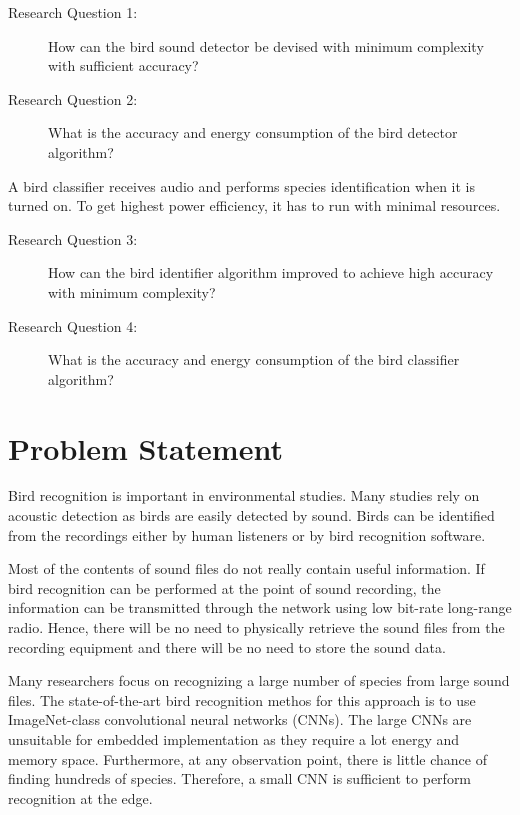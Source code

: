 \begin{description}
    \item [Research Question 1:] How can the bird sound detector be devised with minimum complexity with sufficient accuracy?
    \item [Research Question 2:] What is the accuracy and energy consumption of the bird detector algorithm?
\end{description}

A bird classifier receives audio and performs species identification when it is turned on. To get highest power efficiency, it has to run with minimal resources.

\begin{description}
    \item [Research Question 3:] How can the bird identifier algorithm improved to achieve high accuracy with minimum complexity?
    \item [Research Question 4:] What is the accuracy and energy consumption of the bird classifier algorithm?
\end{description}

\section{Problem Statement}

Bird recognition is important in environmental studies.
Many studies rely on acoustic detection as birds are easily detected by sound. Birds can be identified from the recordings either by human listeners or by bird recognition software.

Most of the contents of sound files do not really contain useful information. If bird recognition can be performed at the point of sound recording, the information can be transmitted through the network using low bit-rate long-range radio. Hence, there will be no need to physically retrieve the sound files from the recording equipment and there will be no need to store the sound data.

Many researchers focus on recognizing a large number of species from large sound files. The state-of-the-art bird recognition methos for this approach is to use ImageNet-class convolutional neural networks (CNNs).
The large CNNs are unsuitable for embedded implementation as they require a lot energy and memory space. Furthermore, at any observation point, there is little chance of finding hundreds of species. Therefore, a small CNN is sufficient to perform recognition at the edge.

